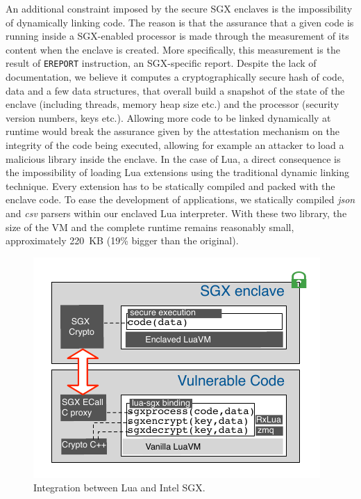 An additional constraint imposed by the secure SGX enclaves is the impossibility of dynamically linking code. 
The reason is that the assurance that a given code is running inside a SGX-enabled processor is made through the measurement of its content when the enclave is created.
More specifically, this measurement is the result of \texttt{EREPORT} instruction, an SGX-specific report.
Despite the lack of documentation, we believe it computes a cryptographically secure hash of code, data and a few data structures, that overall build a snapshot of the state of the enclave (including threads, memory heap size etc.) and the processor (security version numbers, keys etc.).
Allowing more code to be linked dynamically at runtime would break the assurance given by the attestation mechanism on the integrity of the code being executed, allowing for example an attacker to load a malicious library inside the enclave.
In the case of Lua, a direct consequence is the impossibility of loading Lua extensions using the traditional dynamic linking technique. 
Every extension has to be statically compiled and packed with the enclave code. 
To ease the development of \SYS applications, we statically compiled \emph{json} \cite{rfc7159} and \emph{csv}\cite{rfc4180} parsers within our enclaved Lua interpreter.
With these two library, the size of the VM and the complete runtime remains reasonably small, approximately 220~KB (19\% bigger than the original).

\begin{figure}[t!]
  \centering
  \includegraphics[scale=0.85]{images/arch-sgxlua.pdf}
  \caption{Integration between Lua and Intel SGX.}
  \label{fig:arch-luasgx}
\end{figure}


